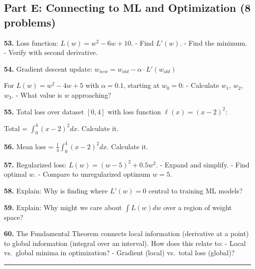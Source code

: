 \documentclass[
  11pt,
]{article}
\begin{document}
\hypertarget{part-e-connecting-to-ml-and-optimization-8-problems}{%
\subsection{Part E: Connecting to ML and Optimization (8
problems)}\label{part-e-connecting-to-ml-and-optimization-8-problems}}

\textbf{53.} Loss function: \(L(w) = w^2 - 6w + 10\). - Find \(L'(w)\).
- Find the minimum. - Verify with second derivative.

\textbf{54.} Gradient descent update:
\(w_{new} = w_{old} - \alpha \cdot L'(w_{old})\)

For \(L(w) = w^2 - 4w + 5\) with \(\alpha = 0.1\), starting at
\(w_0 = 0\): - Calculate \(w_1\), \(w_2\), \(w_3\). - What value is
\(w\) approaching?

\textbf{55.} Total loss over dataset \([0, 4]\) with loss function
\(\ell(x) = (x - 2)^2\):

Total = \(\int_0^4 (x-2)^2 dx\). Calculate it.

\textbf{56.} Mean loss = \(\frac{1}{4}\int_0^4 (x-2)^2 dx\). Calculate
it.

\textbf{57.} Regularized loss: \(L(w) = (w - 5)^2 + 0.5w^2\). - Expand
and simplify. - Find optimal \(w\). - Compare to unregularized optimum
\(w = 5\).

\textbf{58.} Explain: Why is finding where \(L'(w) = 0\) central to
training ML models?

\textbf{59.} Explain: Why might we care about \(\int L(w) dw\) over a
region of weight space?

\textbf{60.} The Fundamental Theorem connects local information
(derivative at a point) to global information (integral over an
interval). How does this relate to: - Local vs.~global minima in
optimization? - Gradient (local) vs.~total loss (global)?

\begin{center}\rule{0.5\linewidth}{0.5pt}\end{center}
\end{document}
